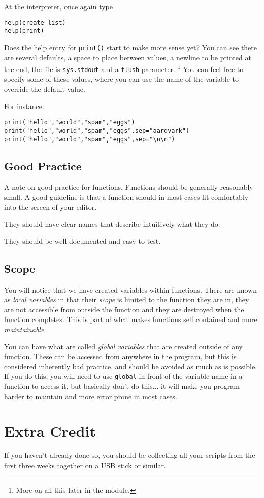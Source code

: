 \documentclass[12pt,oneside]{cttutorial}
\begin{document}
At the interpreter, once again type

\begin{lstlisting}
help(create_list)
help(print)
\end{lstlisting}

Does the help entry for \lstinline!print()! start to make more sense yet? You can see there are several defaults, a space to place between values, a newline to be printed at the end, the file is \lstinline!sys.stdout! and a \lstinline!flush! parameter.
\footnote{More on all this later in the module.}
You can feel free to specify some of these values, where you can use the name of the variable to override the default value.

For instance.
\begin{lstlisting}
print("hello","world","spam","eggs")
print("hello","world","spam","eggs",sep="aardvark")
print("hello","world","spam","eggs",sep="\n\n")
\end{lstlisting}

\subsection{Good Practice}

A note on good practice for functions. Functions should be generally reasonably small. A good guideline is that a function should in most cases fit comfortably into the screen of your editor.

They should have clear names that describe intuitively what they do.

They should be well documented and easy to test.

\subsection{Scope}

You will notice that we have created variables within functions. There are known as \emph{local variables} in that their \emph{scope} is limited to the function they are in, they are not accessible from outside the function and they are destroyed when the function completes. This is part of what makes functions self contained and more \emph{maintainable}.

You can have what are called \emph{global variables} that are created outside of any function. These can be accessed from anywhere in the program, but this is considered inherently bad practice, and should be avoided as much as is possible. If you do this, you will need to use \lstinline!global! in front of the variable name in a function to access it, but basically don't do this... it will make you program harder to maintain and more error prone in most cases.

\section{Extra Credit}

If you haven't already done so, you should be collecting all your scripts from the first three weeks together on a USB stick or similar.
\end{document}
